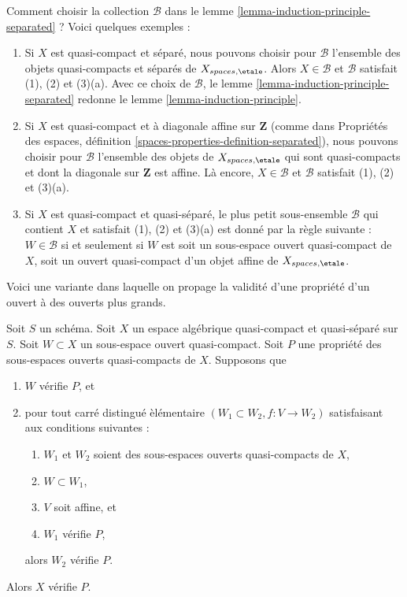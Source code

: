 \begin{remark}
\label{remark-how-to}
Comment choisir la collection $\mathcal{B}$ dans le
lemme \ref{lemma-induction-principle-separated} ?
Voici quelques exemples :
\begin{enumerate}
\item Si $X$ est quasi-compact et séparé, nous pouvons choisir pour
$\mathcal{B}$ l'ensemble des objets quasi-compacts et séparés
de $X_{spaces, \etale}$. Alors $X \in \mathcal{B}$ et $\mathcal{B}$
satisfait (1), (2) et (3)(a). Avec ce choix de $\mathcal{B}$, le
lemme \ref{lemma-induction-principle-separated} redonne le
lemme \ref{lemma-induction-principle}.
\item Si $X$ est quasi-compact et à diagonale affine
sur $\mathbf{Z}$ (comme dans Propriétés des espaces, définition
\ref{spaces-properties-definition-separated}), nous pouvons choisir pour
$\mathcal{B}$ l'ensemble des objets de $X_{spaces, \etale}$ qui sont
quasi-compacts et dont la diagonale sur $\mathbf{Z}$ est affine. Là encore,
$X \in \mathcal{B}$ et $\mathcal{B}$ satisfait (1), (2) et (3)(a).
\item Si $X$ est quasi-compact et quasi-séparé, le plus petit sous-ensemble
$\mathcal{B}$ qui contient $X$ et satisfait (1), (2) et (3)(a) est donné par
la règle suivante : $W \in \mathcal{B}$ si et seulement si $W$ est soit un
sous-espace ouvert quasi-compact de $X$, soit un ouvert quasi-compact d'un
objet affine de $X_{spaces, \etale}$.
\end{enumerate}
\end{remark}

\noindent
Voici une variante dans laquelle on propage la validit\'e d'une propri\'et\'e
d'un ouvert \`a des ouverts plus grands.

\begin{lemma}
\label{lemma-induction-principle-enlarge}
Soit $S$ un sch\'ema. Soit $X$ un espace alg\'ebrique quasi-compact et
quasi-s\'epar\'e sur $S$. Soit $W \subset X$ un sous-espace ouvert
quasi-compact. Soit $P$ une propri\'et\'e des sous-espaces ouverts
quasi-compacts de $X$. Supposons que
\begin{enumerate}
\item $W$ v\'erifie $P$, et
\item pour tout carr\'e distingu\'e \`el\'ementaire
$(W_1 \subset W_2, f : V \to W_2)$ satisfaisant aux conditions suivantes :
\begin{enumerate}
\item $W_1$ et $W_2$ soient des sous-espaces ouverts quasi-compacts de $X$,
\item $W \subset W_1$,
\item $V$ soit affine, et
\item $W_1$ v\'erifie $P$,
\end{enumerate}
alors $W_2$ v\'erifie $P$.
\end{enumerate}
Alors $X$ v\'erifie $P$.
\end{lemma}

